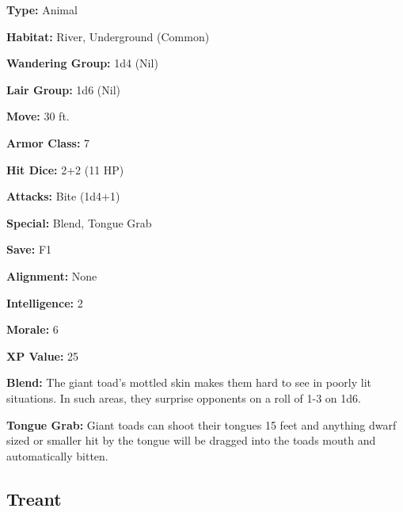 \begin{multicols*}{2}
{\textbf{Type:} Animal

\textbf{Habitat:} River, Underground (Common)

\textbf{Wandering Group:} 1d4 (Nil)

\textbf{Lair Group:} 1d6 (Nil)

\textbf{Move:} 30 ft.

\textbf{Armor Class:} 7

\textbf{Hit Dice:} 2+2 (11 HP)

\textbf{Attacks:} Bite (1d4+1)

\textbf{Special:} Blend, Tongue Grab

\textbf{Save:} F1

\textbf{Alignment:} None

\textbf{Intelligence:} 2

\textbf{Morale:} 6

\textbf{XP Value:} 25}

\textbf{Blend:} The giant toad's mottled skin makes them hard to see in poorly lit situations. In such areas, they surprise opponents on a roll of 1-3 on 1d6.

\textbf{Tongue Grab:} Giant toads can shoot their tongues 15 feet and anything dwarf sized or smaller hit by the tongue will be dragged into the toads mouth and automatically bitten.

\subsection{Treant}
\end{multicols*}
